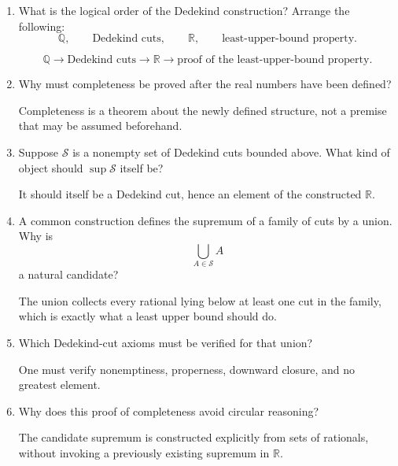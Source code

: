 \documentclass{self-check}
\begin{document}
\begin{enumerate}[label=\arabic*., itemsep=10pt]

\item What is the logical order of the Dedekind construction?
Arrange the following:
\[
\mathbb{Q},\qquad
\text{Dedekind cuts},\qquad
\mathbb{R},\qquad
\text{least-upper-bound property}.
\]

\begin{answer}
\[
\mathbb{Q}
\longrightarrow
\text{Dedekind cuts}
\longrightarrow
\mathbb{R}
\longrightarrow
\text{proof of the least-upper-bound property}.
\]
\end{answer}

\item Why must completeness be proved after the real numbers have been defined?

\begin{answer}
Completeness is a theorem about the newly defined structure, not a premise that may be assumed beforehand.
\end{answer}

\item Suppose $\mathcal{S}$ is a nonempty set of Dedekind cuts bounded above.
What kind of object should $\sup \mathcal{S}$ itself be?

\begin{answer}
It should itself be a Dedekind cut, hence an element of the constructed $\mathbb{R}$.
\end{answer}

\item A common construction defines the supremum of a family of cuts by a union.
Why is
\[
\bigcup_{A\in\mathcal{S}} A
\]
a natural candidate?

\begin{answer}
The union collects every rational lying below at least one cut in the family, which is exactly what a least upper bound should do.
\end{answer}

\item Which Dedekind-cut axioms must be verified for that union?

\begin{answer}
One must verify nonemptiness, properness, downward closure, and no greatest element.
\end{answer}

\item Why does this proof of completeness avoid circular reasoning?

\begin{answer}
The candidate supremum is constructed explicitly from sets of rationals, without invoking a previously existing supremum in $\mathbb{R}$.
\end{answer}


\end{enumerate}
\end{document}
